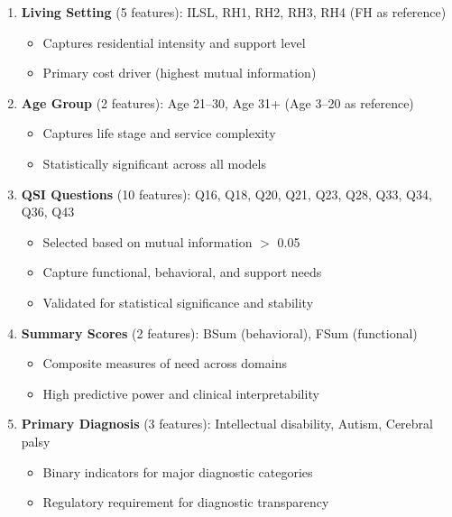 \begin{enumerate}
    \item \textbf{Living Setting} (5 features): ILSL, RH1, RH2, RH3, RH4 (FH as reference)
    \begin{itemize}
        \item Captures residential intensity and support level
        \item Primary cost driver (highest mutual information)
    \end{itemize}
    
    \item \textbf{Age Group} (2 features): Age 21--30, Age 31+ (Age 3--20 as reference)
    \begin{itemize}
        \item Captures life stage and service complexity
        \item Statistically significant across all models
    \end{itemize}
    
    \item \textbf{QSI Questions} (10 features): Q16, Q18, Q20, Q21, Q23, Q28, Q33, Q34, Q36, Q43
    \begin{itemize}
        \item Selected based on mutual information $>$ 0.05
        \item Capture functional, behavioral, and support needs
        \item Validated for statistical significance and stability
    \end{itemize}
    
    \item \textbf{Summary Scores} (2 features): BSum (behavioral), FSum (functional)
    \begin{itemize}
        \item Composite measures of need across domains
        \item High predictive power and clinical interpretability
    \end{itemize}
    
    \item \textbf{Primary Diagnosis} (3 features): Intellectual disability, Autism, Cerebral palsy
    \begin{itemize}
        \item Binary indicators for major diagnostic categories
        \item Regulatory requirement for diagnostic transparency
    \end{itemize}
\end{enumerate}

